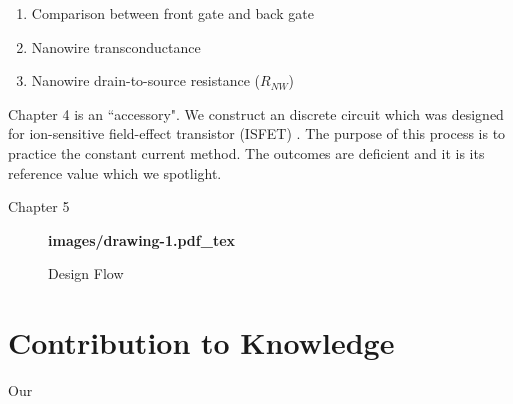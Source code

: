 \begin{enumerate}
\item Comparison between front gate and back gate
\item Nanowire transconductance
\item Nanowire drain-to-source resistance ($R_{NW}$)
\end{enumerate}

Chapter 4 is an ``accessory".
We construct an discrete circuit which was designed for ion-sensitive field-effect transistor (ISFET) \cite{SF1}.
The purpose of this process is to practice the constant current method.
The outcomes are deficient and it is its reference value which we spotlight.

{\color{red}Chapter 5}


\begin{figure}[!htbp]
    \centering
    {\selectfont\textbf{
        \def\svgwidth{5.0cm}
        \fontsize{6}{7}\selectfont
         {images/drawing-1.pdf_tex}
    }}
    \fontsize{6}{7}\selectfont
    \caption{Design Flow}
    \label{fig:designFlow}
\end{figure}



\section{Contribution to Knowledge}
Our



%
%
%
%

